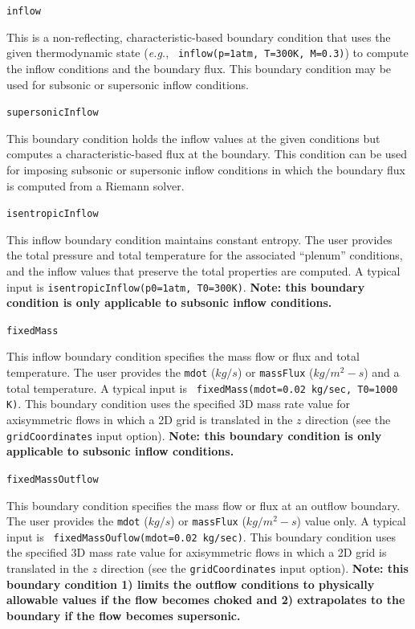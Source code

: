 \documentclass{article}
\begin{document}
  \begin{list}{}{}

    
  \item {\tt inflow}

    This is a non-reflecting, characteristic-based boundary condition
    that uses the given thermodynamic state ({\it{e.g.}}, {\tt
      inflow(p=1atm, T=300K, M=0.3)}) to
    compute the inflow conditions and the boundary flux.  This
    boundary condition may be used for subsonic or supersonic inflow
    conditions.
    
  \item {\tt supersonicInflow}

    This boundary condition holds the inflow values at the given
    conditions but computes a characteristic-based flux at the
    boundary.  This condition can be used for imposing subsonic or
    supersonic inflow conditions in which the boundary flux is
    computed from a Riemann solver.

  \item {\tt isentropicInflow}

    This inflow boundary condition maintains constant entropy.  The
    user provides the total pressure and total temperature for the
    associated ``plenum'' conditions, and the inflow values that
    preserve the total properties are computed.  A typical input is
    {\tt isentropicInflow(p0=1atm, T0=300K)}.  {\bf Note: this
      boundary condition is only applicable to subsonic inflow
      conditions.}

  \item {\tt fixedMass}

    This inflow boundary condition specifies the mass flow or flux
    and total temperature.  The user provides the
    {\tt mdot} ($kg/s$) or {\tt massFlux} ($kg/m^2-s$) and
    a total temperature.  A typical input is {\tt
    fixedMass(mdot=0.02 kg/sec, T0=1000 K)}.  This boundary condition
    uses the specified 3D mass rate value for axisymmetric flows in which a 2D grid
    is translated in the $z$ direction (see the {\tt gridCoordinates} input option).  {\bf Note:
    this boundary condition is only applicable to subsonic inflow conditions.}

  \item {\tt fixedMassOutflow}

    This boundary condition specifies the mass flow or flux
    at an outflow boundary.  The user provides the
    {\tt mdot} ($kg/s$) or {\tt massFlux} ($kg/m^2-s$) value only.  A typical input is {\tt
    fixedMassOuflow(mdot=0.02 kg/sec)}.  This boundary condition
    uses the specified 3D mass rate value for axisymmetric flows in which a 2D grid
    is translated in the $z$ direction (see the {\tt gridCoordinates} input option).  {\bf Note:
    this boundary condition 1) limits the outflow conditions to physically allowable values if the flow
    becomes choked and 2) extrapolates to the boundary if the flow becomes supersonic.}


\end{list}
\end{document}
